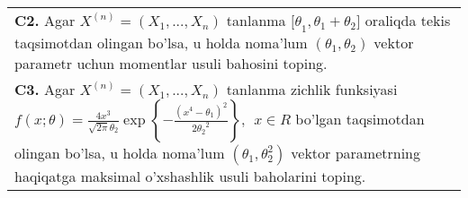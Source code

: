 \documentclass{article}
\begin{document}
\begin{tabular}{m{17cm}}
\\
\textbf{C2.} 
Agar \(X^{(n)} = \left( X_{1},...,X_{n} \right)\) tanlanma \({\lbrack\theta}_{1},\theta_{1} + \theta_{2}\rbrack\) oraliqda tekis taqsimotdan olingan bo'lsa, u holda noma'lum \(\left( \theta_{1},\theta_{2} \right)\) vektor parametr uchun momentlar usuli bahosini toping.
\\
\textbf{C3.} 
Agar \(X^{(n)} = \left( X_{1},...,X_{n} \right)\) tanlanma zichlik funksiyasi\(f(x;\theta) = \frac{4x^{3}}{\sqrt{2\pi}\theta_{2}}\exp\left\{ - \frac{\left( x^{4} - \theta_{1} \right)^{2}}{2{\theta_{2}}^{2}} \right\},\ \ x \in R\) bo'lgan taqsimotdan olingan bo'lsa, u holda noma'lum \(\left( \theta_{1},\theta_{2}^{2} \right)\) vektor parametrning haqiqatga maksimal o'xshashlik usuli baholarini toping.
\\

\end{tabular}
\vspace{1cm}
\end{document}
